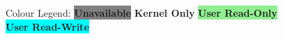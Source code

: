 \begin{figure}

    \newcommand{\memsection}[6][lrtb]{%
        \bytefieldsetup{bitheight=#4\baselineskip}%
        \bitbox[]{10}{
            \texttt{#2} \\ %
            \vspace{#4\baselineskip}
            \vspace{-2\baselineskip}
            \vspace{-#4pt}
            \texttt{#3} %
        }
        \bitbox[#1]{16}[bgcolor=#5]{\small #6}
    }

    \newcommand{\memgap}[2][lrtb]{
        \bytefieldsetup{bitheight=#2\baselineskip}
        \bitbox[#1]{16}[bgcolor=gray]{\small Gap}
    }

    Colour Legend:
    \colorbox{gray}{\textbf{Unavailable}}
    \colorbox{lightred}{\textbf{Kernel Only}}
    \colorbox{lightgreen}{\textbf{User Read-Only}}
    \colorbox{cyan}{\textbf{User Read-Write}}


\end{figure}

